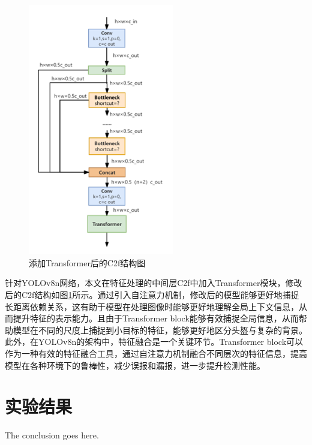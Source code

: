 \documentclass[journal]{IEEEtran}
\numberwithin{figure}{section}%
\begin{document}
\begin{figure}
  \centering
  \includegraphics[width=2.5in]{./figures/4_4.png}
  \caption{添加Transformer后的C2f结构图}
  \label{fig:C2fr}
\end{figure}

针对YOLOv8n网络，本文在特征处理的中间层C2f中加入Transformer模块，修改后的C2f结构如图\ref{fig:C2fr}所示。通过引入自注意力机制，修改后的模型能够更好地捕捉长距离依赖关系，这有助于模型在处理图像时能够更好地理解全局上下文信息，从而提升特征的表示能力。且由于Transformer block能够有效捕捉全局信息，从而帮助模型在不同的尺度上捕捉到小目标的特征，能够更好地区分头盔与复杂的背景。此外，在YOLOv8n的架构中，特征融合是一个关键环节。Transformer block可以作为一种有效的特征融合工具，通过自注意力机制融合不同层次的特征信息，提高模型在各种环境下的鲁棒性，减少误报和漏报，进一步提升检测性能。


\section{实验结果}
The conclusion goes here.

\end{document}
